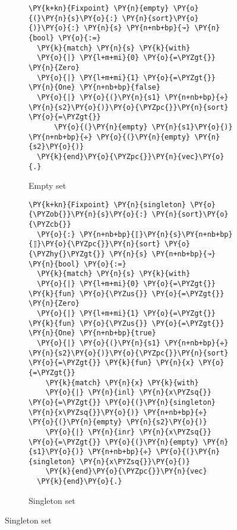 \begin{figure}
\begin{subfigure}{0.5\textwidth}
\begin{Verbatim}[commandchars=\\\{\}]
\PY{k+kn}{Fixpoint} \PY{n}{empty} \PY{o}{(}\PY{n}{s}\PY{o}{:} \PY{n}{sort}\PY{o}{)}\PY{o}{:} \PY{n}{s} \PY{n+nb+bp}{↝} \PY{n}{bool} \PY{o}{:=}
  \PY{k}{match} \PY{n}{s} \PY{k}{with}
  \PY{o}{|} \PY{l+m+mi}{0} \PY{o}{=\PYZgt{}} \PY{n}{Zero}
  \PY{o}{|} \PY{l+m+mi}{1} \PY{o}{=\PYZgt{}} \PY{n}{One} \PY{n+nb+bp}{false}
  \PY{o}{|} \PY{o}{(}\PY{n}{s1} \PY{n+nb+bp}{✛} \PY{n}{s2}\PY{o}{)}\PY{o}{\PYZpc{}}\PY{n}{sort} \PY{o}{=\PYZgt{}}
      \PY{o}{(}\PY{n}{empty} \PY{n}{s1}\PY{o}{)} \PY{n+nb+bp}{✛} \PY{o}{(}\PY{n}{empty} \PY{n}{s2}\PY{o}{)}
  \PY{k}{end}\PY{o}{\PYZpc{}}\PY{n}{vec}\PY{o}{.}
\end{Verbatim}
  \caption{Empty set}
  \label{code:empty}
  \vspace{1cm}
\end{subfigure}
\hfill
\begin{subfigure}{0.5\textwidth}
\begin{Verbatim}[commandchars=\\\{\}]
\PY{k+kn}{Fixpoint} \PY{n}{singleton} \PY{o}{\PYZob{}}\PY{n}{s}\PY{o}{:} \PY{n}{sort}\PY{o}{\PYZcb{}}
  \PY{o}{:} \PY{n+nb+bp}{⟦}\PY{n}{s}\PY{n+nb+bp}{⟧}\PY{o}{\PYZpc{}}\PY{n}{sort} \PY{o}{\PYZhy{}\PYZgt{}} \PY{n}{s} \PY{n+nb+bp}{↝} \PY{n}{bool} \PY{o}{:=}
  \PY{k}{match} \PY{n}{s} \PY{k}{with}
  \PY{o}{|} \PY{l+m+mi}{0} \PY{o}{=\PYZgt{}} \PY{k}{fun} \PY{o}{\PYZus{}} \PY{o}{=\PYZgt{}} \PY{n}{Zero}
  \PY{o}{|} \PY{l+m+mi}{1} \PY{o}{=\PYZgt{}} \PY{k}{fun} \PY{o}{\PYZus{}} \PY{o}{=\PYZgt{}} \PY{n}{One} \PY{n+nb+bp}{true}
  \PY{o}{|} \PY{o}{(}\PY{n}{s1} \PY{n+nb+bp}{✛} \PY{n}{s2}\PY{o}{)}\PY{o}{\PYZpc{}}\PY{n}{sort} \PY{o}{=\PYZgt{}} \PY{k}{fun} \PY{n}{x} \PY{o}{=\PYZgt{}}
    \PY{k}{match} \PY{n}{x} \PY{k}{with}
    \PY{o}{|} \PY{n}{inl} \PY{n}{x\PYZsq{}} \PY{o}{=\PYZgt{}} \PY{o}{(}\PY{n}{singleton} \PY{n}{x\PYZsq{}}\PY{o}{)} \PY{n+nb+bp}{✛} \PY{o}{(}\PY{n}{empty} \PY{n}{s2}\PY{o}{)}
    \PY{o}{|} \PY{n}{inr} \PY{n}{x\PYZsq{}} \PY{o}{=\PYZgt{}} \PY{o}{(}\PY{n}{empty} \PY{n}{s1}\PY{o}{)} \PY{n+nb+bp}{✛} \PY{o}{(}\PY{n}{singleton} \PY{n}{x\PYZsq{}}\PY{o}{)}
    \PY{k}{end}\PY{o}{\PYZpc{}}\PY{n}{vec}
  \PY{k}{end}\PY{o}{.}
\end{Verbatim}
  \caption{Singleton set}
  \label{code:singleton}
\end{subfigure}


\end{figure}
